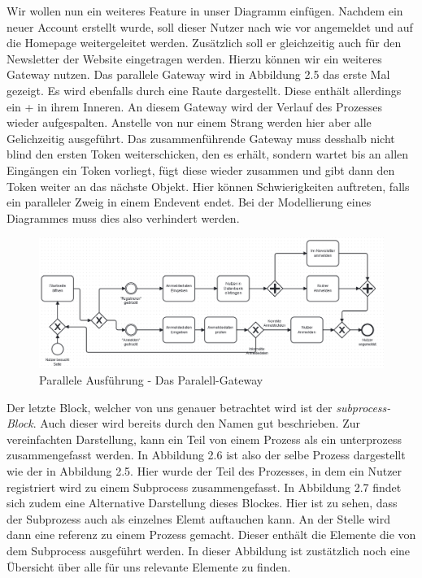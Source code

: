 Wir wollen nun ein weiteres Feature in unser Diagramm einfügen. Nachdem ein neuer Account erstellt wurde, soll dieser Nutzer nach wie vor angemeldet und auf die Homepage weitergeleitet werden. Zusätzlich soll er gleichzeitig auch für den Newsletter der Website eingetragen werden. Hierzu können wir ein weiteres Gateway nutzen. Das parallele Gateway wird in Abbildung 2.5 das erste Mal gezeigt. Es wird ebenfalls durch eine Raute dargestellt. Diese enthält allerdings ein + in ihrem Inneren. An diesem Gateway wird der Verlauf des Prozesses wieder aufgespalten. Anstelle von nur einem Strang werden hier aber alle Gelichzeitig ausgeführt. Das zusammenführende Gateway muss desshalb nicht blind den ersten Token weiterschicken, den es erhält, sondern wartet bis an allen Eingängen ein Token vorliegt, fügt diese wieder zusammen und gibt dann den Token weiter an das nächste Objekt. Hier können Schwierigkeiten auftreten, falls ein paralleler Zweig in einem Endevent endet. Bei der Modellierung eines Diagrammes muss dies also verhindert werden. 
\begin{figure}
\centering
\includegraphics[scale=0.5]{Figures/Beispiel6}
\decoRule
\caption[Paralell-Gateway]{Parallele Ausführung - Das Paralell-Gateway}
\label{fig:Task}
\end{figure}

Der letzte Block, welcher von uns genauer betrachtet wird ist der \emph{subprocess-Block}. Auch dieser wird bereits durch den Namen gut beschrieben. Zur vereinfachten Darstellung, kann ein Teil von einem Prozess als ein unterprozess zusammengefasst werden. In Abbildung 2.6 ist also der selbe Prozess dargestellt wie der in Abbildung 2.5. Hier wurde der Teil des Prozesses, in dem ein Nutzer registriert wird zu einem Subprocess zusammengefasst. In Abbildung 2.7 findet sich zudem eine Alternative Darstellung dieses Blockes. Hier ist zu sehen, dass der Subprozess auch als einzelnes Elemt auftauchen kann. An der Stelle wird dann eine referenz zu einem Prozess gemacht. Dieser enthält die Elemente die von dem Subprocess ausgeführt werden. In dieser Abbildung ist zustätzlich noch eine Übersicht über alle für uns relevante Elemente zu finden. 

